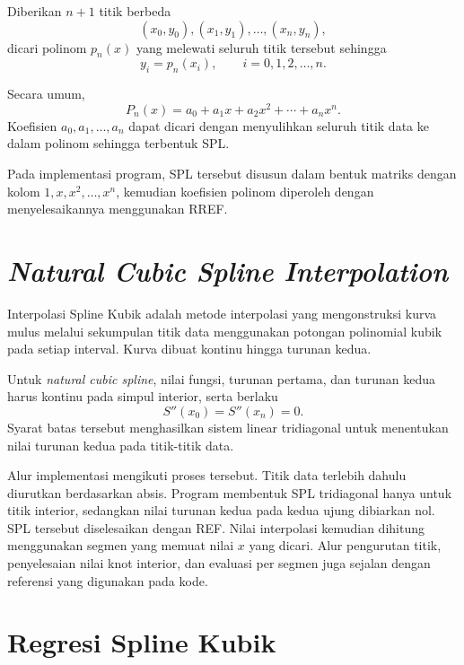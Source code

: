 \documentclass[12pt,a4paper]{report}
\begin{document}
Diberikan $n+1$ titik berbeda
\begin{equation*}
(x_0,y_0),(x_1,y_1),\ldots,(x_n,y_n),
\end{equation*}
dicari polinom $p_n(x)$ yang melewati seluruh titik tersebut sehingga
\begin{equation*}
y_i=p_n(x_i),\qquad i=0,1,2,\ldots,n.
\end{equation*}
\cite{pakrin-interpolasi}

Secara umum,
\begin{equation*}
P_n(x)=a_0+a_1x+a_2x^2+\cdots+a_nx^n.
\end{equation*}
Koefisien $a_0,a_1,\ldots,a_n$ dapat dicari dengan menyulihkan seluruh titik data ke dalam polinom sehingga terbentuk SPL. \cite{tubes}

Pada implementasi program, SPL tersebut disusun dalam bentuk matriks dengan kolom $1,x,x^2,\ldots,x^n$, kemudian koefisien polinom diperoleh dengan menyelesaikannya menggunakan RREF.

\section{\textit{Natural Cubic Spline Interpolation}}

Interpolasi Spline Kubik adalah metode interpolasi yang mengonstruksi kurva mulus melalui sekumpulan titik data menggunakan potongan polinomial kubik pada setiap interval. Kurva dibuat kontinu hingga turunan kedua. \cite{tubes}

Untuk \textit{natural cubic spline}, nilai fungsi, turunan pertama, dan turunan kedua harus kontinu pada simpul interior, serta berlaku
\begin{equation*}
S''(x_0)=S''(x_n)=0.
\end{equation*}
Syarat batas tersebut menghasilkan sistem linear tridiagonal untuk menentukan nilai turunan kedua pada titik-titik data. \cite{tubes,mathworld-spline}

Alur implementasi mengikuti proses tersebut. Titik data terlebih dahulu diurutkan berdasarkan absis. Program membentuk SPL tridiagonal hanya untuk titik interior, sedangkan nilai turunan kedua pada kedua ujung dibiarkan nol. SPL tersebut diselesaikan dengan REF. Nilai interpolasi kemudian dihitung menggunakan segmen yang memuat nilai $x$ yang dicari. Alur pengurutan titik, penyelesaian nilai knot interior, dan evaluasi per segmen juga sejalan dengan referensi yang digunakan pada kode. \cite{medium-spline}

\section{Regresi Spline Kubik}
\end{document}
